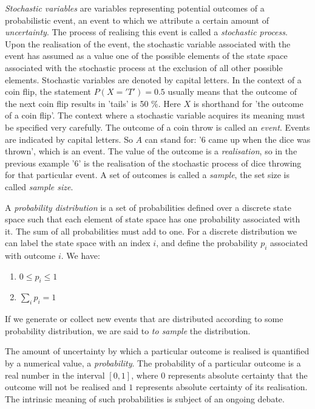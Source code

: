   
\emph{Stochastic variables} are variables representing potential outcomes of a
probabilistic event, an event to which we attribute a certain amount of
\emph{uncertainty}. The process of realising this event is called a \emph{stochastic process}.
Upon the realisation of the event, the stochastic variable associated
with the event has assumed as a value one of the possible elements of the
state space associated with the stochastic process at the exclusion of all other
possible elements. Stochastic variables are denoted by capital letters. In the context
of a coin flip, the statement $P(X='T') = 0.5$ usually means that the outcome
of the next coin flip results in 'tails' is 50 \%. Here $X$ is shorthand for
'the outcome of a coin flip'. The context where a stochastic variable
acquires its meaning must be specified very carefully. The outcome of a coin throw
is called an \emph{event}. Events are indicated by capital letters. So $A$ can stand
for: '6 came up when the dice was thrown', which is an  event. The value of the
outcome is a \emph{realisation}, so in the previous example '6' is the realisation
of the stochastic process of dice throwing for that particular event. A set of
outcomes is called a \emph{sample}, the set size is called  \emph{sample size}.

A \emph{probability distribution} is a set of probabilities defined over a discrete state
space such that each element of state space has one probability associated with it.
The sum of all probabilities must add to one.  
For a discrete distribution we can label the state space with an index $i$, and
define the probability $p_i$ associated with outcome $i$. We have:
\begin{enumerate}
\item $0 \le p_i \le 1$
\item $\sum_i p_i = 1$ 
\end{enumerate}


  
If we generate or collect new events that are distributed according to some
probability distribution, we are said to \emph{to sample} the distribution.
  
The amount of uncertainty by which a particular outcome is realised is quantified
by a numerical value, a \emph{probability}. The probability of a particular outcome
is a real number in the interval $[0,1]$, where $0$ represents absolute certainty
that the outcome will not be realised and $1$ represents absolute certainty of its
realisation. The intrinsic meaning of such probabilities is subject of an ongoing
debate.
  
